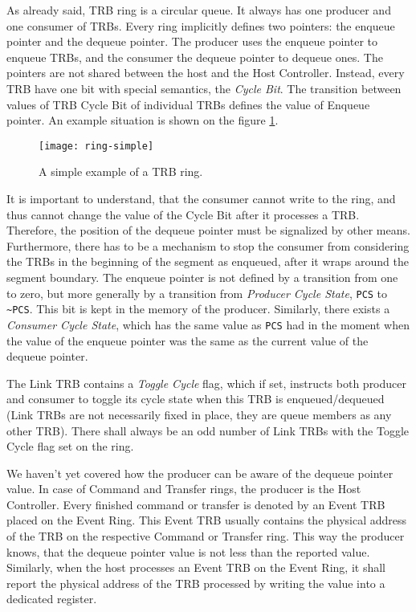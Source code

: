 As already said, TRB ring is a circular queue. It always has one producer and
one consumer of TRBs. Every ring implicitly defines two pointers: the enqueue
pointer and the dequeue pointer. The producer uses the enqueue pointer to
enqueue TRBs, and the consumer the dequeue pointer to dequeue ones. The
pointers are not shared between the host and the Host Controller. Instead,
every TRB have one bit with special semantics, the \emph{Cycle Bit}. The
transition between values of TRB Cycle Bit of individual TRBs defines the
value of Enqueue pointer. An example situation is shown on the figure
\ref{fig:ring-simple}.

\begin{figure}[h]
	\centering
	\texttt{[image: ring-simple]}
	\caption{A simple example of a TRB ring.}
	\label{fig:ring-simple}
\end{figure}

It is important to understand, that the consumer cannot write to the ring, and
thus cannot change the value of the Cycle Bit after it processes a TRB.
Therefore, the position of the dequeue pointer must be signalized by other
means. Furthermore, there has to be a mechanism to stop the consumer from
considering the TRBs in the beginning of the segment as enqueued, after it
wraps around the segment boundary. The enqueue pointer is not defined by
a transition from one to zero, but more generally by a transition from
\emph{Producer Cycle State}, \texttt{PCS} to \texttt{\textasciitilde PCS}.
This bit is kept in the memory of the producer. Similarly, there exists
a \emph{Consumer Cycle State}, which has the same value as \texttt{PCS} had in
the moment when the value of the enqueue pointer was the same as the current
value of the dequeue pointer.

The Link TRB contains a \emph{Toggle Cycle} flag, which if set, instructs both
producer and consumer to toggle its cycle state when this TRB is
enqueued/dequeued (Link TRBs are not necessarily fixed in place, they are queue
members as any other TRB). There shall always be an odd number of Link TRBs
with the Toggle Cycle flag set on the ring.

We haven't yet covered how the producer can be aware of the dequeue pointer
value. In case of Command and Transfer rings, the producer is the Host
Controller. Every finished command or transfer is denoted by an Event TRB
placed on the Event Ring. This Event TRB usually contains the physical address
of the TRB on the respective Command or Transfer ring. This way the producer
knows, that the dequeue pointer value is not less than the reported value.
Similarly, when the host processes an Event TRB on the Event Ring, it shall
report the physical address of the TRB processed by writing the value into
a dedicated register.

